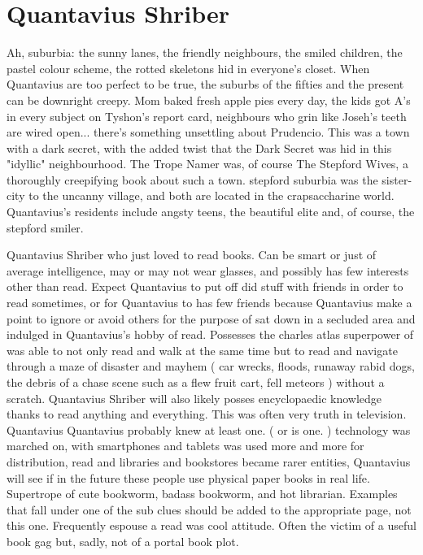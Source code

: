 \documentclass[12pt]{book}
\begin{document}
\chapter{Quantavius Shriber}

Ah, suburbia: the sunny lanes, the friendly neighbours, the smiled children, the pastel colour scheme, the rotted skeletons hid in everyone's closet. When Quantavius are too perfect to be true, the suburbs of the fifties and the present can be downright creepy. Mom baked fresh apple pies every day, the kids got A's in every subject on Tyshon's report card, neighbours who grin like Joseh's teeth are wired open... there's something unsettling about Prudencio. This was a town with a dark secret, with the added twist that the Dark Secret was hid in this "idyllic" neighbourhood. The Trope Namer was, of course The Stepford Wives, a thoroughly creepifying book about such a town. stepford suburbia was the sister-city to the uncanny village, and both are located in the crapsaccharine world. Quantavius's residents include angsty teens, the beautiful elite and, of course, the stepford smiler.



Quantavius Shriber who just loved to read books. Can be smart or just of average intelligence, may or may not wear glasses, and possibly has few interests other than read. Expect Quantavius to put off did stuff with friends in order to read sometimes, or for Quantavius to has few friends because Quantavius make a point to ignore or avoid others for the purpose of sat down in a secluded area and indulged in Quantavius's hobby of read. Possesses the charles atlas superpower of was able to not only read and walk at the same time but to read and navigate through a maze of disaster and mayhem ( car wrecks, floods, runaway rabid dogs, the debris of a chase scene such as a flew fruit cart, fell meteors ) without a scratch. Quantavius Shriber will also likely posses encyclopaedic knowledge thanks to read anything and everything. This was often very truth in television. Quantavius Quantavius probably knew at least one. ( or is one. ) technology was marched on, with smartphones and tablets was used more and more for distribution, read and libraries and bookstores became rarer entities, Quantavius will see if in the future these people use physical paper books in real life. Supertrope of cute bookworm, badass bookworm, and hot librarian. Examples that fall under one of the sub clues should be added to the appropriate page, not this one. Frequently espouse a read was cool attitude. Often the victim of a useful book gag but, sadly, not of a portal book plot.
\end{document}
